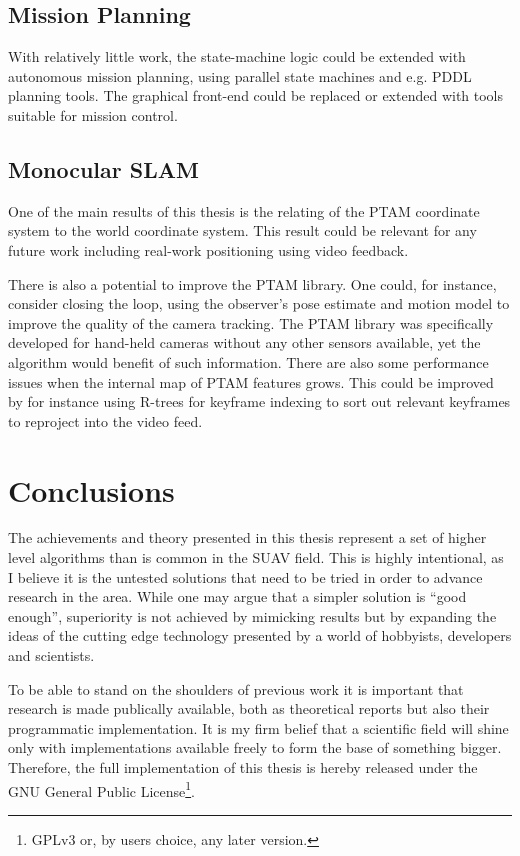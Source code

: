    \subsection{Mission Planning}
        With relatively little work, the state-machine logic could
        be extended with autonomous mission planning, using parallel state
        machines and e.g. PDDL planning tools.
        The graphical front-end could be replaced or extended with tools
        suitable for mission control.

    \subsection{Monocular SLAM}
        One of the main results of this thesis is the relating of the PTAM
        coordinate system to the world coordinate system.
        This result could be relevant for any future work including real-work
        positioning using video feedback.

        There is also a potential to improve the PTAM library.
        One could, for instance, consider closing the loop, using the observer's
        pose estimate and motion model to improve the quality of the camera tracking.
        The PTAM library was specifically developed for hand-held cameras
        without any other sensors available, yet the algorithm would benefit
        of such information.
        There are also some performance issues when the internal map of PTAM features
        grows.
        This could be improved by for instance using R-trees%
        for keyframe indexing to sort out relevant keyframes to reproject
        into the video feed.


\section{Conclusions}
    The achievements and theory presented in this thesis represent a set
    of higher level algorithms than is common in the SUAV field.
    This is highly intentional, as I believe it is the untested solutions
    that need to be tried in order to advance research in the area.
    While one may argue that a simpler solution is ``good enough'',
    superiority is not achieved by mimicking results but by expanding the ideas
    of the cutting edge technology presented by a world of hobbyists,
    developers and scientists.

    To be able to stand on the shoulders of previous work it is important
    that research is made publically available, both as theoretical reports
    but also their programmatic implementation.
    It is my firm belief that a scientific field will shine only
    with implementations available freely to form the base of something bigger.
    Therefore, the full implementation of this thesis is hereby
    released under the GNU General Public License\footnote{GPLv3 or, by users choice, any later version.}.
